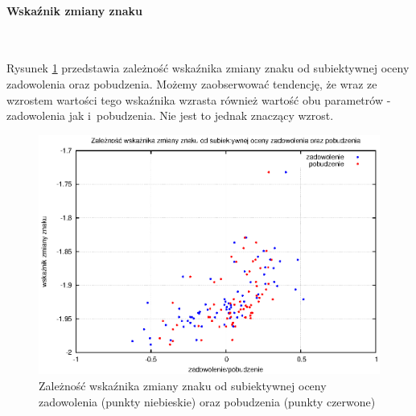 \paragraph{Wskaźnik zmiany znaku}\mbox{}\\
\begin{minipage}{\textwidth}
Rysunek \ref{wykresCrossRate} przedstawia zależność wskaźnika zmiany znaku od subiektywnej oceny zadowolenia oraz pobudzenia. Możemy zaobserwować tendencję, że wraz ze wzrostem wartości tego wskaźnika wzrasta również wartość obu parametrów - zadowolenia jak i~pobudzenia. Nie jest to jednak znaczący wzrost.
\end{minipage}
\begin{figure}[ht!]
\centering
\includegraphics[scale=\imageSize]{res/crossRate.eps}
\caption{Zależność wskaźnika zmiany znaku od subiektywnej oceny zadowolenia (punkty niebieskie) oraz pobudzenia (punkty czerwone)\label{wykresCrossRate}}
\end{figure}
